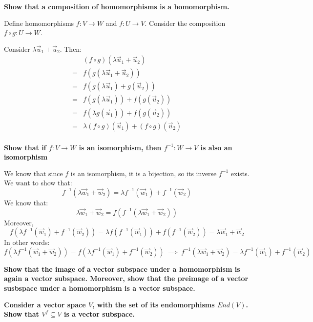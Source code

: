 \documentclass{exam}
\begin{document}
\begin{questions}

\question \textbf{Show that a composition of homomorphisms is a homomorphism.}

\bigskip

Define homomorphisms $f : V \to W$ and $f : U \to V$. Consider the composition $f \circ g : U \to W$.

\bigskip

Consider $\lambda \vec{u}_1 + \vec{u}_2$. Then:
\begin{align*}
    &(f \circ g)(\lambda \vec{u}_1 + \vec{u}_2) \\
    = & f(g(\lambda \vec{u}_1 + \vec{u}_2)) \\
    = & f(g(\lambda \vec{u}_1) + g(\vec{u}_2)) \\
    = & f(g(\lambda \vec{u}_1)) + f(g(\vec{u}_2)) \\
    = & f(\lambda g(\vec{u}_1)) + f(g(\vec{u}_2)) \\
    = & \lambda (f \circ g)(\vec{u}_1) + (f \circ g)(\vec{u}_2) \\
\end{align*}

\bigskip

\question \textbf{Show that if $f : V \to W$ is an isomorphism, then $f^{-1} : W \to V$ is also an isomorphism}

\bigskip

We know that since $f$ is an isomorphism, it is a bijection, so its inverse $f^{-1}$ exists. We want to show that:
\[
f^{-1}(\lambda\vec{w}_1 + \vec{w}_2) = \lambda f^{-1}(\vec{w}_1) + f^{-1}(\vec{w}_2)
\]
We know that:
\[
\lambda\vec{w}_1 + \vec{w}_2  = f(f^{-1}(\lambda\vec{w}_1 + \vec{w}_2))
\]
Moreover,
\[
f(\lambda f^{-1}(\vec{w}_1 ) + f^{-1}(\vec{w}_2)) = \lambda f( f^{-1}(\vec{w}_1)) + f(f^{-1}(\vec{w}_2)) = \lambda\vec{w}_1 + \vec{w}_2
\]
In other words:
\[
f(\lambda f^{-1}(\vec{w}_1 + \vec{w}_2)) = f(\lambda f^{-1}(\vec{w}_1 ) + f^{-1}(\vec{w}_2)) \ \implies \ f^{-1}(\lambda\vec{w}_1 + \vec{w}_2) = \lambda f^{-1}(\vec{w}_1 ) + f^{-1}(\vec{w}_2)
\]

\question \textbf{Show that the image of a vector subspace under a homomorphism is again a vector subspace. Moreover, show that the preimage of a vector susbspace under a homomorphism is a vector subspace.}

\question \textbf{Consider a vector space $V$, with the set of its endomorphisms $End(V)$. Show that $V^f \subseteq V$ is a vector subspace.}


\end{questions}
\end{document}
